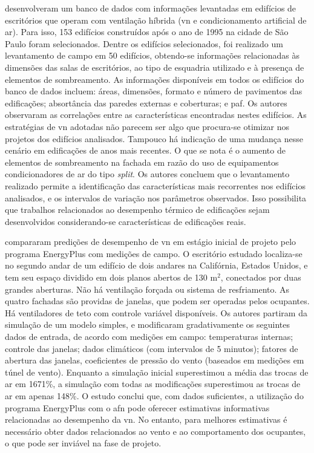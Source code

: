 \documentclass[brazil,hardcopy,openany]{ufscthesis} %
\begin{document}
 desenvolveram um banco de dados com informações levantadas em edifícios de escritórios que operam com ventilação híbrida (\acrshort{vn} e condicionamento artificial de ar). Para isso, 153 edifícios construídos após o ano de 1995 na cidade de São Paulo foram selecionados. Dentre os edifícios selecionados, foi realizado um levantamento de campo em 50 edifícios, obtendo-se informações relacionadas às dimensões das salas de escritórios, ao tipo de esquadria utilizado e à presença de elementos de sombreamento. As informações disponíveis em todos os edifícios do banco de dados incluem: áreas, dimensões, formato e número de pavimentos das edificações; absortância das paredes externas e coberturas; e \acrfull{paf}. Os autores observaram as correlações entre as características encontradas nestes edifícios. As estratégias de \acrshort{vn} adotadas não parecem ser algo que procura-se otimizar nos projetos dos edifícios analisados. Tampouco há indicação de uma mudança nesse cenário em edificações de anos mais recentes. O que se nota é o aumento de elementos de sombreamento na fachada em razão do uso de equipamentos condicionadores de ar do tipo \textit{split}. Os autores concluem que o levantamento realizado permite a identificação das características mais recorrentes nos edifícios analisados, e os intervalos de variação nos parâmetros observados.
Isso possibilita que trabalhos relacionados ao desempenho térmico de edificações sejam desenvolvidos considerando-se características de edificações reais.

 compararam predições de desempenho de \acrshort{vn} em estágio inicial de projeto pelo programa EnergyPlus com medições de campo. O escritório estudado localiza-se no segundo andar de um edifício de dois andares na Califórnia, Estados Unidos, e tem seu espaço dividido em dois planos abertos de 130 m$^2$, conectados por duas grandes aberturas. Não há ventilação forçada ou sistema de resfriamento. As quatro fachadas são providas de janelas, que podem ser operadas pelos ocupantes. Há ventiladores de teto com controle variável disponíveis. Os autores partiram da simulação de um modelo simples, e modificaram gradativamente os seguintes dados de entrada, de acordo com medições em campo: temperaturas internas; controle das janelas; dados climáticos (com intervalos de 5 minutos); fatores de abertura das janelas, coeficientes de pressão do vento (baseados em medições em túnel de vento). Enquanto a simulação inicial superestimou a média das trocas de ar em 1671\%, a simulação com todas as modificações superestimou as trocas de ar em apenas 148\%. O estudo conclui que, com dados suficientes, a utilização do programa EnergyPlus com o \acrshort{afn} pode oferecer  estimativas informativas relacionadas ao desempenho da \acrshort{vn}. No entanto, para melhores estimativas é necessário obter dados relacionados ao vento e ao comportamento dos ocupantes, o que pode ser inviável na fase de projeto.
\end{document}
